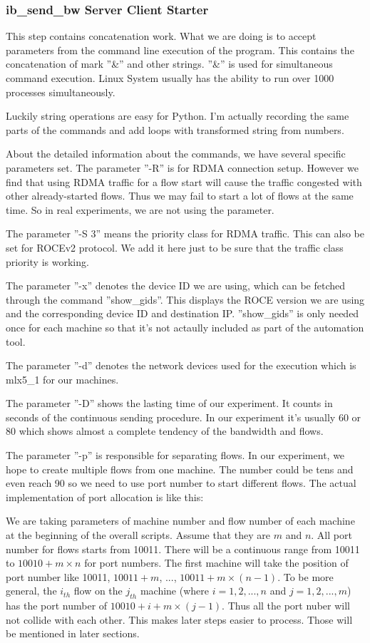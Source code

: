 \documentclass[12pt,a4paper]{article}
\begin{document}
\subsubsection{ib\_send\_bw Server Client Starter}

This step contains concatenation work.
What we are doing is to accept parameters from the command line execution of the program.
This contains the concatenation of mark ''\&'' and other strings.
''\&'' is used for simultaneous command execution. Linux System usually has the ability to run over 1000 processes simultaneously.

Luckily string operations are easy for Python.
I'm actually recording the same parts of the commands and add loops with transformed string from numbers.

About the detailed information about the commands, we have several specific parameters set.
The parameter ''-R'' is for RDMA connection setup. However we find that using RDMA traffic for a flow start will cause
the traffic congested with other already-started flows. Thus we may fail to start a lot of flows at the same time.
So in real experiments, we are not using the parameter.

The parameter ''-S 3'' means the priority class for RDMA traffic. This can also be set for ROCEv2 protocol.
We add it here just to be sure that the traffic class priority is working.

The parameter ''-x'' denotes the device ID we are using, which can be fetched through the command ''show\_gids''.
This displays the ROCE version we are using and the corresponding device ID and destination IP.
''show\_gids'' is only needed once for each machine so that it's not actaully included as part of the automation tool.

The parameter ''-d'' denotes the network devices used for the execution which is mlx5\_1 for our machines.

The parameter ''-D'' shows the lasting time of our experiment. It counts in seconds of the continuous sending procedure.
In our experiment it's usually 60 or 80 which shows almost a complete tendency of the bandwidth and flows.

The parameter ''-p'' is responsible for separating flows. In our experiment, we hope to create multiple flows from one machine.
The number could be tens and even reach 90 so we need to use port number to start different flows.
The actual implementation of port allocation is like this: 

We are taking parameters of machine number and flow number of each machine at the beginning of the overall scripts.
Assume that they are $m$ and $n$.
All port number for flows starts from 10011. There will be a continuous range from 10011 to $10010+m\times n$ for port numbers.
The first machine will take the position of port number like 10011, $10011+m$, ..., $10011+m\times(n-1)$.
To be more general, the $i_{th}$ flow on the $j_{th}$ machine (where $i=1,2,...,n$ and $j=1,2,...,m$) has the port number of
$10010+i+m\times(j-1)$.
Thus all the port nuber will not collide with each other. This makes later steps easier to process.
Those will be mentioned in later sections.
\end{document}
